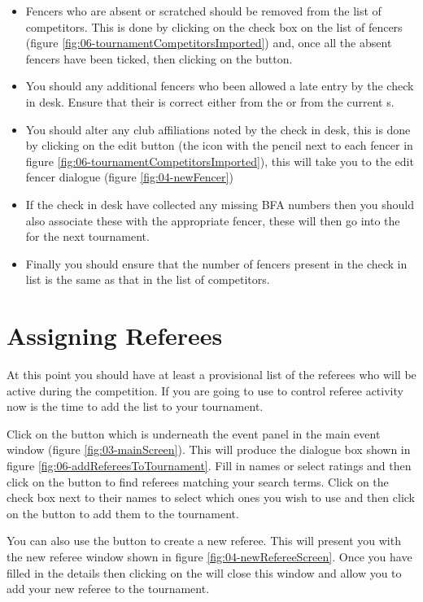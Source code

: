 \documentclass[a4paper,11pt]{memoir}
\begin{document}
\begin{itemize}
 \item  Fencers who are absent or scratched should be removed from the list of competitors. This is done by clicking on the check box on the list of fencers (figure \ref{fig:06-tournamentCompetitorsImported}) and, once all the absent fencers have been ticked, then clicking on the  button.
 \item You should any additional fencers who  been allowed a late entry by the check in desk. Ensure that their  is correct either from the  or from the current s.
 \item You should alter any club affiliations noted by the check in desk, this is done by clicking on the edit button (the icon with the pencil next to each fencer in figure \ref{fig:06-tournamentCompetitorsImported}), this will take you to the edit fencer dialogue (figure \ref{fig:04-newFencer})
 \item If the check in desk have collected any missing BFA numbers then you should also associate these with the appropriate fencer, these will then go into the  for the next tournament.
 \item Finally you should ensure that the number of fencers present in the check in list is the same as that in the list of competitors.
\end{itemize}

\section{Assigning Referees}
At this point you should have at least a provisional list of the referees who will be active during the competition. If you are going to use \fencingtime{} to control referee activity now is the time to add the list to your tournament.

Click on the  button which is underneath the event panel in the main event window (figure \ref{fig:03-mainScreen}). This will produce the dialogue box shown in figure \ref{fig:06-addRefereesToTournament}. Fill in names or select ratings and then click on the  button to find referees matching your search terms. Click on the check box next to their names to select which ones you wish to use and then click on the  button to add them to the tournament.

You can also use the  button to create a new referee. This will present you with the new referee window shown in figure \ref{fig:04-newRefereeScreen}. Once you have filled in the details then clicking on the  will close this window and allow you to add your new referee to the tournament.  
\end{document}
